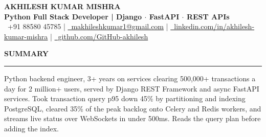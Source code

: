 \documentclass[10pt]{article}
\newcommand{\resumesection}[1]{%
  \vspace{6pt}%
  {\fontfamily{phv}\selectfont\textbf{\large\MakeUppercase{#1}}}%
  \vspace{2pt}%
  \hrule%
  \vspace{4pt}%
}
\begin{document}
\begin{center}
    {\selectfont\textbf{\Huge AKHILESH KUMAR MISHRA}} \\
    \vspace{3pt}
    {\selectfont\large\textbf{\textcolor{primaryblue}{Python Full Stack Developer | Django $\cdot$ FastAPI $\cdot$ REST APIs}}} \\
    \vspace{4pt}
    {\small
    \textcolor{primaryblue}{\faPhone*}~+91 88580 45785 \quad | \quad
    \href{mailto:makhileshkumar1@gmail.com}{\textcolor{primaryblue}{\faEnvelope}~makhileshkumar1@gmail.com} \quad | \quad
    \href{https://linkedin.com/in/akhilesh-kumar-mishra-a46030231}{\textcolor{primaryblue}{\faLinkedin}~linkedin.com/in/akhilesh-kumar-mishra} \quad | \quad
    \href{https://github.com/GitHub-akhilesh}{\textcolor{primaryblue}{\faGithub}~github.com/GitHub-akhilesh}
    }
\end{center}
\vspace{-10pt}

\resumesection{Summary}
Python backend engineer, 3+ years on services clearing 500,000+ transactions a day for 2 million+ users, served by Django REST Framework and async FastAPI services. Took transaction query p95 down 45\% by partitioning and indexing PostgreSQL, cleared 35\% of the peak backlog onto Celery and Redis workers, and streams live status over WebSockets in under 500ms. Reads the query plan before adding the index.
\end{document}
